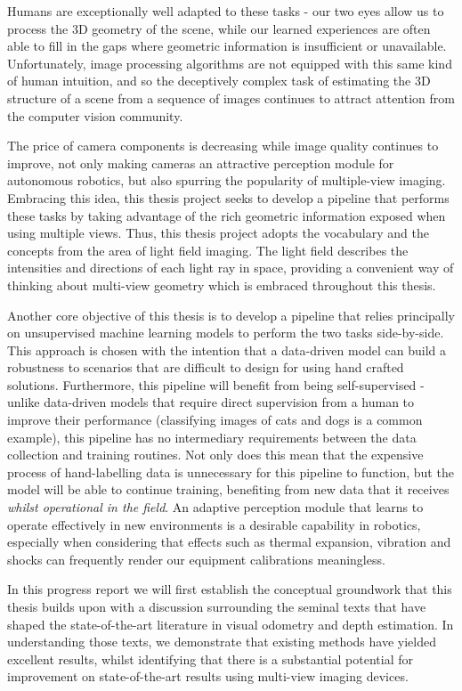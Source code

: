 \documentclass[openany]{book}
\begin{document}
Humans are exceptionally well adapted to these tasks - our two eyes allow us to process the 3D geometry of the scene, while our learned experiences are often able to fill in the gaps where geometric information is insufficient or unavailable. Unfortunately, image processing algorithms are not equipped with this same kind of human intuition, and so the deceptively complex task of estimating the 3D structure of a scene from a sequence of images continues to attract attention from the computer vision community. 


The price of camera components is decreasing while image quality continues to improve, not only making cameras an attractive perception module for autonomous robotics, but also spurring the popularity of multiple-view imaging. Embracing this idea, this thesis project seeks to develop a pipeline that performs these tasks by taking advantage of the rich geometric information exposed when using multiple views. Thus, this thesis project adopts the vocabulary and the concepts from the area of light field imaging. The light field describes the intensities and directions of each light ray in space, providing a convenient way of thinking about multi-view geometry which is embraced throughout this thesis.


Another core objective of this thesis is to develop a pipeline that relies principally on unsupervised machine learning models to perform the two tasks side-by-side. This approach is chosen with the intention that a data-driven model can build a robustness to scenarios that are difficult to design for using hand crafted solutions.  Furthermore, this pipeline will benefit from being self-supervised - unlike data-driven models that require direct supervision from a human to improve their performance (classifying images of cats and dogs is a common example), this pipeline has no intermediary requirements between the data collection and training routines. Not only does this mean that the expensive process of hand-labelling data is unnecessary for this pipeline to function, but the model will be able to continue training, benefiting from new data that it receives \textit{whilst operational in the field}. An adaptive perception module that learns to operate effectively in new environments is a desirable capability in robotics, especially when considering that effects such as thermal expansion, vibration and shocks can frequently render our equipment calibrations meaningless. 


In this progress report we will first establish the conceptual groundwork that this thesis builds upon with a discussion surrounding the seminal texts that have shaped the state-of-the-art literature in visual odometry and depth estimation. In understanding those texts, we demonstrate that existing methods have yielded excellent results, whilst identifying that there is a substantial potential for improvement on state-of-the-art results using multi-view imaging devices. 
\end{document}
